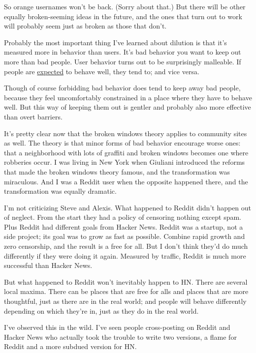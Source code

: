 \documentclass[12pt]{book}
\begin{document}
So orange usernames won't be back. (Sorry about that.) But there will be
other equally broken-seeming ideas in the future, and the ones that turn
out to work will probably seem just as broken as those that don't.

Probably the most important thing I've learned about dilution is that
it's measured more in behavior than users. It's bad behavior you want to
keep out more than bad people. User behavior turns out to be
surprisingly malleable. If people are
\href{http://ycombinator.com/newswelcome.html}{expected} to behave well,
they tend to; and vice versa.

Though of course forbidding bad behavior does tend to keep away bad
people, because they feel uncomfortably constrained in a place where
they have to behave well. But this way of keeping them out is gentler
and probably also more effective than overt barriers.

It's pretty clear now that the broken windows theory applies to
community sites as well. The theory is that minor forms of bad behavior
encourage worse ones: that a neighborhood with lots of graffiti and
broken windows becomes one where robberies occur. I was living in New
York when Giuliani introduced the reforms that made the broken windows
theory famous, and the transformation was miraculous. And I was a Reddit
user when the opposite happened there, and the transformation was
equally dramatic.

I'm not criticizing Steve and Alexis. What happened to Reddit didn't
happen out of neglect. From the start they had a policy of censoring
nothing except spam. Plus Reddit had different goals from Hacker News.
Reddit was a startup, not a side project; its goal was to grow as fast
as possible. Combine rapid growth and zero censorship, and the result is
a free for all. But I don't think they'd do much differently if they
were doing it again. Measured by traffic, Reddit is much more successful
than Hacker News.

But what happened to Reddit won't inevitably happen to HN. There are
several local maxima. There can be places that are free for alls and
places that are more thoughtful, just as there are in the real world;
and people will behave differently depending on which they're in, just
as they do in the real world.

I've observed this in the wild. I've seen people cross-posting on Reddit
and Hacker News who actually took the trouble to write two versions, a
flame for Reddit and a more subdued version for HN.
\end{document}
